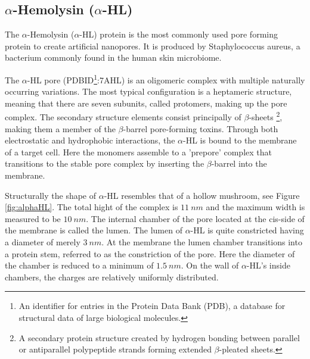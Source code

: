\subsection{$\alpha$-Hemolysin ($\alpha$-HL)}

The $\alpha$-Hemolysin ($\alpha$-HL) protein is the most commonly used pore forming
protein to create artificial nanopores. It is produced by Staphylococcus aureus, a
bacterium commonly found in the human skin microbiome.\cite{Bhakdi1991}

The $\alpha$-HL pore (PDBID\footnote{An identifier for entries in the Protein Data Bank
(PDB), a database for structural data of large biological
molecules.}:7AHL\cite{Song1859}) is an oligomeric complex
with multiple naturally occurring variations. The most typical configuration
is a heptameric structure, meaning that there are seven subunits, called protomers,
making up the pore complex.
The secondary structure elements consist principally of $\beta$-sheets \footnote{A
secondary protein structure created by hydrogen bonding between parallel or
antiparallel polypeptide strands forming extended $\beta$-pleated sheets.}, making
them a member of the $\beta$-barrel pore-forming toxins. Through both electrostatic and
hydrophobic interactions, the $\alpha$-HL is bound to the membrane of a target cell. Here
the monomers assemble to a 'prepore' complex that transitions to the stable pore complex
by inserting the $\beta$-barrel into the membrane.\cite{SUGAWARA2015226}

Structurally the shape of $\alpha$-HL resembles that of a hollow mushroom, see Figure
\ref{fig:alphaHL}. The total hight of the complex is $11\ nm$ and the maximum width is
measured to be $10\ nm$. The
internal chamber of the pore located at the cis-side of the membrane is called the lumen.
The lumen of $\alpha$-HL is quite constricted having a diameter of merely $3\ nm$.  At
the membrane the lumen chamber transitions into a protein stem, referred to as the
constriction of the pore. Here the diameter of the chamber is reduced to a minimum of
$1.5\ nm$. On the wall of $\alpha$-HL's inside chambers, the charges are relatively
uniformly distributed. \vspace{.4cm}

